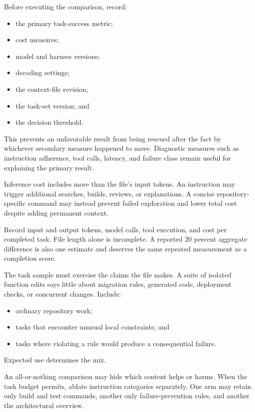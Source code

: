
Before executing the comparison, record:

\begin{itemize}
\tightlist
\item
  the primary task-success metric;
\item
  cost measures;
\item
  model and harness versions;
\item
  decoding settings;
\item
  the context-file revision;
\item
  the task-set version; and
\item
  the decision threshold.
\end{itemize}

This prevents an unfavorable result from being rescued after the fact by whichever secondary measure happened to move. Diagnostic measures such as instruction adherence, tool calls, latency, and failure class remain useful for explaining the primary result.

Inference cost includes more than the file's input tokens. An instruction may trigger additional searches, builds, reviews, or explanations. A concise repository-specific command may instead prevent failed exploration and lower total cost despite adding permanent context.

Record input and output tokens, model calls, tool execution, and cost per completed task. File length alone is incomplete. A reported 20 percent aggregate difference is also one estimate and deserves the same repeated measurement as a completion score.


The task sample must exercise the claims the file makes. A suite of isolated function edits says little about migration rules, generated code, deployment checks, or concurrent changes. Include:

\begin{itemize}
\tightlist
\item
  ordinary repository work;
\item
  tasks that encounter unusual local constraints; and
\item
  tasks where violating a rule would produce a consequential failure.
\end{itemize}

Expected use determines the mix.

An all-or-nothing comparison may hide which content helps or harms. When the task budget permits, ablate instruction categories separately. One arm may retain only build and test commands, another only failure-prevention rules, and another the architectural overview.

